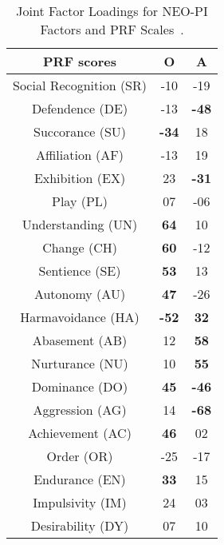 \begin{table} [h]
\centering
\begin{tabular}{c c c} 
\\
 \hline \hline
PRF	scores				& \textbf{O} 	&\textbf{A}	\\ [0.5ex] 
 \hline
 Social Recognition (SR)		& -10 		& -19		\\ 
 Defendence (DE)			& -13		& \textbf{-48}	\\
 Succorance (SU)			& \textbf{-34}	& 18			\\
 Affiliation (AF)				& -13  		& 19			\\
 Exhibition (EX)				& 23			& \textbf{-31}	\\
 Play (PL)					& 07			& -06		\\
 Understanding (UN)			& \textbf{64}	& 10			\\
 Change (CH)				& \textbf{60}	& -12		\\
 Sentience (SE)				& \textbf{53}	& 13			\\
 Autonomy (AU)			& \textbf{47}	& -26		\\
 Harmavoidance (HA)		& \textbf{-52}	& \textbf{32}	\\
 Abasement (AB)			& 12			& \textbf{58}	\\
 Nurturance (NU)			& 10			& \textbf{55}	\\
 Dominance (DO)			& \textbf{45}	& \textbf{-46}	\\
 Aggression (AG)			& 14			& \textbf{-68}	\\
 Achievement (AC)			& \textbf{46}	& 02			\\
 Order (OR)				& -25		& -17		\\
 Endurance (EN)			& \textbf{33}	& 15			\\
 Impulsivity (IM)				& 24			& 03			\\
 Desirability (DY)			& 07			& 10			\\ [1ex] 
 \hline \hline		
 \end{tabular}
\caption[]{Joint Factor Loadings for NEO-PI Factors and PRF Scales~\cite{costa1988catalog}\footnotemark.}
 \label{table:2}
 \end{table}

